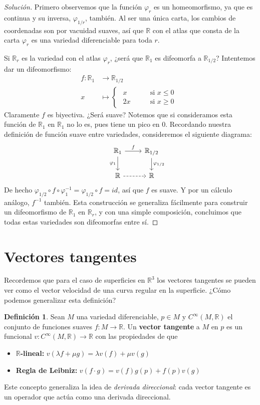 \documentclass[spanish]{book}
\theoremstyle{definition}
\newtheorem*{defn}{Definición}
\newcommand{\R}{\mathbb{R}}
\begin{document}
\begin{proof}[Solución]
	Primero observemos que la función $\varphi_r$ es un homeomorfismo, ya que es continua y su inversa, $\varphi_{1/r}$, también. Al ser una única carta, los cambios de coordenadas son por vacuidad suaves, así que $\R$ con el atlas que consta de la carta $\varphi_r$ es una variedad diferenciable para toda $r$.
	
	Si $\R_r$ es la variedad con el atlas $\varphi_r$, ¿será que $\R_1$ es difeomorfa a $\R_{1/2}$? Intentemos dar un difeomorfismo:
	\begin{align*}
		f:\R_1&\to\R_{1/2}\\
		x&\mapsto\begin{cases}
			\begin{aligned}
				x\qquad&\text{si }x\leq0\\
				2x\qquad&\text{si }x\geq0
			\end{aligned}
		\end{cases}
	\end{align*}
	Claramente $f$ es biyectiva. ¿Será suave? Notemos que si consideramos esta función de $\R_1$ en $\R_1$ no lo es, pues tiene un pico en 0. Recordando nuestra definición de función suave entre variedades, consideremos el siguiente diagrama:
	\[\begin{tikzcd}
		&\R_1\arrow{r}{f}\arrow[swap]{d}{\varphi_1}&\R_{1/2}\arrow{d}{\varphi_{1/2}}\\
		&\R\arrow[dashed]{r}&\R
	\end{tikzcd}\]
	De hecho $\varphi_{1/2}\circ f\circ\varphi^{-1}_1=\varphi_{1/2}\circ f=id$, así que $f$ es suave. Y por un cálculo análogo, $f^{-1}$ también. Esta construcción se generaliza fácilmente para construir un difeomorfismo de $\R_1$ en $\R_r$, y con una simple composición, concluimos que todas estas variedades son difeomorfas entre sí.
\end{proof}

\section{Vectores tangentes}
Recordemos que para el caso de superficies en $\R^3$ los vectores tangentes se pueden ver como el vector velocidad de una curva regular en la superficie. ¿Cómo podemos generalizar esta definición?
\begin{defn}
	Sean $M$ una variedad diferenciable, $p\in M$ y $C^\infty(M,\R)$ el conjunto de funciones suaves $f:M\to\R$. Un \textbf{vector tangente} a $M$ en $p$ es un funcional $v:C^\infty(M,\R)\to\R$ con las propiedades de que
	\begin{itemize}
		\item \textbf{$\R$-lineal:} $v(\lambda f+\mu g)=\lambda v(f)+\mu v(g)$
		\item \textbf{Regla de Leibniz:} $v(f\cdot g)=v(f)g(p)+f(p)v(g)$
	\end{itemize}
\end{defn}
Este concepto generaliza la idea de \textit{derivada direccional}: cada vector tangente es un operador que actúa como una derivada direccional.
\end{document}
